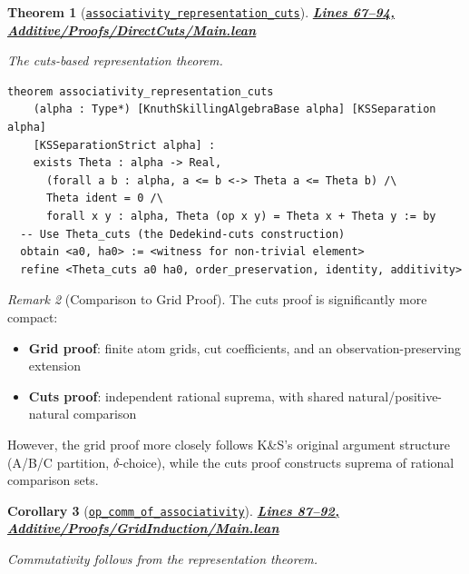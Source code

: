 \documentclass[11pt]{article}
\newtheorem{theorem}{Theorem}[section]
\newtheorem{corollary}[theorem]{Corollary}
\theoremstyle{definition}
\theoremstyle{remark}
\newtheorem{remark}[theorem]{Remark}
\begin{document}
\begin{theorem}[\href{https://github.com/zariuq/ks-foundations-of-inference/blob/main/KnuthSkilling/Additive/Proofs/DirectCuts/Main.lean\#L67}{\texttt{associativity\_representation\_cuts}}]
\textbf{\href{https://github.com/zariuq/ks-foundations-of-inference/blob/main/KnuthSkilling/Additive/Proofs/DirectCuts/Main.lean\#L67-L94}{Lines 67--94, Additive/Proofs/DirectCuts/Main.lean}}

The cuts-based representation theorem.
\end{theorem}

\begin{lstlisting}[caption={Appendix A (cuts proof)}]
theorem associativity_representation_cuts
    (alpha : Type*) [KnuthSkillingAlgebraBase alpha] [KSSeparation alpha]
    [KSSeparationStrict alpha] :
    exists Theta : alpha -> Real,
      (forall a b : alpha, a <= b <-> Theta a <= Theta b) /\
      Theta ident = 0 /\
      forall x y : alpha, Theta (op x y) = Theta x + Theta y := by
  -- Use Theta_cuts (the Dedekind-cuts construction)
  obtain <a0, ha0> := <witness for non-trivial element>
  refine <Theta_cuts a0 ha0, order_preservation, identity, additivity>
\end{lstlisting}

\begin{remark}[Comparison to Grid Proof]
The cuts proof is significantly more compact:
\begin{itemize}
\item \textbf{Grid proof}: finite atom grids, cut coefficients, and an observation-preserving extension
\item \textbf{Cuts proof}: independent rational suprema, with shared natural/positive-natural comparison
\end{itemize}

However, the grid proof more closely follows K\&S's original argument structure (A/B/C partition, $\delta$-choice),
while the cuts proof constructs suprema of rational comparison sets.
\end{remark}

\begin{corollary}[\href{https://github.com/zariuq/ks-foundations-of-inference/blob/main/KnuthSkilling/Additive/Proofs/GridInduction/Main.lean\#L87}{\texttt{op\_comm\_of\_associativity}}]
\textbf{\href{https://github.com/zariuq/ks-foundations-of-inference/blob/main/KnuthSkilling/Additive/Proofs/GridInduction/Main.lean\#L87-L92}{Lines 87--92, Additive/Proofs/GridInduction/Main.lean}}

Commutativity follows from the representation theorem.
\end{corollary}
\end{document}
